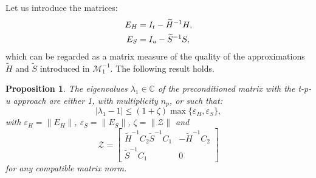 \documentclass[3p,times]{elsarticle}
\theoremstyle{plain}
\newtheorem{prop}[thm]{Proposition}
\newcommand{\tS}{\widetilde{S}}
\newcommand{\tH}{\widetilde{H}}
\begin{document}
Let us introduce the matrices:
\begin{subequations}
\begin{align}
    E_H &= I_t - \tH^{-1} H, \label{eq:EH} \\
    E_S &= I_u - \tS^{-1} S, \label{eq:ES}
\end{align}
\label{eq:E_tpu}\null
\end{subequations}
which can be regarded as a matrix measure of the quality of the approximations $\tH$ and $\tS$ introduced in $\mathcal{M}_1^{-1}$. The following result holds.

\begin{prop}
\label{th:eig_tpu}
The eigenvalues $\lambda_1 \in \mathbb{C}$ of the preconditioned matrix with the t-p-u approach are either 1, with multiplicity $n_p$, or such that:
\begin{equation}
    \left| \lambda_1 - 1 \right| \leq \left( 1 + \zeta \right) \max\{\varepsilon_H,\varepsilon_S\},
    \label{eq:eig_tpu}
\end{equation}
with $\varepsilon_H=\|E_H\|$, $\varepsilon_S=\|E_S\|$, $\zeta=\|\mathcal{Z}\|$ and
\begin{equation}
    \mathcal{Z} = \left[ \begin{array}{cc}
    \tH^{-1} C_2 \tS^{-1} C_1 & -\tH^{-1} C_2 \\ \tS^{-1} C_1 & 0 \end{array} \right]
    \label{eq:Z_prop1}
\end{equation}
for any compatible matrix norm.
\end{prop}
\end{document}
